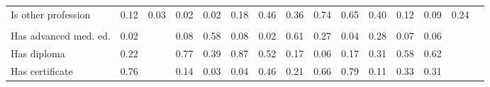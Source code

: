 \begin{tabular}{l*{14}{c}}
Is other profession&           {0.12}&        {0.03}&  {0.02}&  {0.02}&    {0.18}&        {0.46}&        {0.36}&        {0.74}&        {0.65}&        {0.40}&       {0.12}&       {0.09}&       {0.24}\\
&   {}\\
Has advanced med. ed.&         {0.02}&        {}&  {0.08}&  {0.58}&    {0.08}&        {0.02}&        {0.61}&        {0.27}&        {0.04}&        {0.28}&       {0.07}&       {0.06}&       {}\\
Has diploma&                           {0.22}&        {}&  {0.77}&  {0.39}&    {0.87}&        {0.52}&        {0.17}&        {0.06}&        {0.17}&        {0.31}&       {0.58}&       {0.62}&       {}\\
Has certificate&                       {0.76}&        {}&  {0.14}&  {0.03}&    {0.04}&        {0.46}&        {0.21}&        {0.66}&        {0.79}&        {0.11}&       {0.33}&       {0.31}&       {}\\
\hline
\end{tabular}